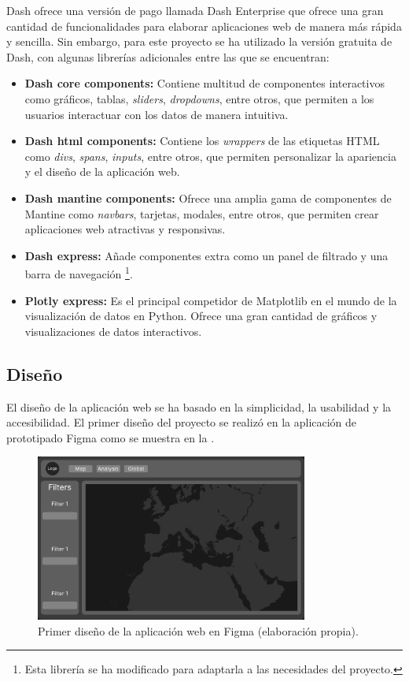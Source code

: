 Dash ofrece una versión de pago llamada Dash Enterprise que ofrece una gran cantidad de funcionalidades para elaborar aplicaciones web de manera más rápida y sencilla. Sin embargo, para este proyecto se ha utilizado la versión gratuita de Dash, con algunas librerías adicionales entre las que se encuentran:

\begin{itemize}
	\item \textbf{Dash core components:} Contiene multitud de componentes interactivos como gráficos, tablas, \textit{sliders}, \textit{dropdowns}, entre otros, que permiten a los usuarios interactuar con los datos de manera intuitiva.
	\item \textbf{Dash html components:} Contiene los \textit{wrappers} de las etiquetas HTML como \textit{divs}, \textit{spans}, \textit{inputs}, entre otros, que permiten personalizar la apariencia y el diseño de la aplicación web.
	\item \textbf{Dash mantine components:} Ofrece una amplia gama de componentes de Mantine como \textit{navbars}, tarjetas, modales, entre otros, que permiten crear aplicaciones web atractivas y responsivas.
	\item \textbf{Dash express:} Añade componentes extra como un panel de filtrado y una barra de navegación \footnote{Esta librería se ha modificado para adaptarla a las necesidades del proyecto.}.
	\item \textbf{Plotly express:} Es el principal competidor de Matplotlib en el mundo de la visualización de datos en Python. Ofrece una gran cantidad de gráficos y visualizaciones de datos interactivos.
\end{itemize}

\subsection{Diseño}
El diseño de la aplicación web se ha basado en la simplicidad, la usabilidad y la accesibilidad. El primer diseño del proyecto se realizó en la aplicación de prototipado Figma como se muestra en la .

\begin{figure}[h]
	\centering
	\includegraphics[width=0.8\textwidth]{Imagenes/Chapter_4/first_draft.png}
	\caption[Primer diseño de la aplicación web en Figma.]{Primer diseño de la aplicación web en Figma (elaboración propia).}
	\label{fig:figma}
\end{figure}

